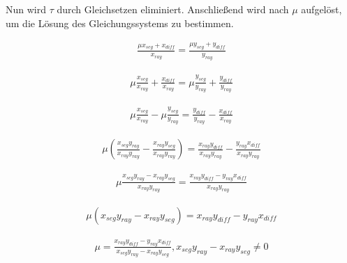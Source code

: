 Nun wird $\tau$ durch Gleichsetzen eliminiert. Anschließend wird nach $\mu$ aufgelöst,
um die Lösung des Gleichungssystems zu bestimmen.

\begin{equation}
\begin{aligned}
\frac{\mu x_{seg} + x_{diff}}{x_{ray}} = \frac{\mu y_{seg} + y_{diff}}{y_{ray}}
\end{aligned}
\end{equation}

\begin{equation}
\begin{aligned}
\mu \frac{x_{seg}}{x_{ray}} + \frac{x_{diff}}{x_{ray}}
= \mu \frac{y_{seg}}{y_{ray}} + \frac{y_{diff}}{y_{ray}}
\end{aligned}
\end{equation}

\begin{equation}
\begin{aligned}
\mu \frac{x_{seg}}{x_{ray}} - \mu \frac{y_{seg}}{y_{ray}}
= \frac{y_{diff}}{y_{ray}} - \frac{x_{diff}}{x_{ray}}
\end{aligned}
\end{equation}

\begin{equation}
\begin{aligned}
\mu \left(\frac{x_{seg} y_{ray}}{x_{ray} y_{ray}} - \frac{x_{ray} y_{seg}}{x_{ray} y_{ray}}\right)
= \frac{x_{ray} y_{diff}}{x_{ray} y_{ray}} - \frac{y_{ray} x_{diff}}{x_{ray} y_{ray}}
\end{aligned}
\end{equation}

\begin{equation}
\begin{aligned}
\mu \frac{x_{seg} y_{ray} - x_{ray} y_{seg}}{x_{ray} y_{ray}}
= \frac{x_{ray} y_{diff} - y_{ray} x_{diff}}{x_{ray} y_{ray}}
\end{aligned}
\end{equation}

\begin{equation}
\begin{aligned}
\mu (x_{seg} y_{ray} - x_{ray} y_{seg}) = x_{ray} y_{diff} - y_{ray} x_{diff}
\end{aligned}
\end{equation}

\begin{equation}
\begin{aligned}
\mu = \frac{x_{ray} y_{diff} - y_{ray} x_{diff}}{x_{seg} y_{ray} - x_{ray} y_{seg}},
x_{seg} y_{ray} - x_{ray} y_{seg} \neq 0
\end{aligned}
\end{equation}

